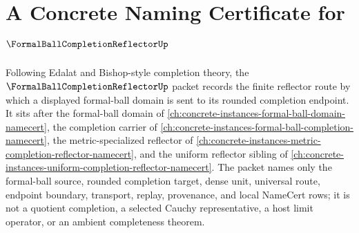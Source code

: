 \chapter{A Concrete Naming Certificate for $\FormalBallCompletionReflectorUp$}
\label{ch:concrete-instances-formal-ball-completion-reflector-namecert}

Following Edalat and Bishop-style completion theory, the $\FormalBallCompletionReflectorUp$ packet records the finite reflector route by which a displayed formal-ball domain is sent to its rounded completion endpoint. It sits after the formal-ball domain of \autoref{ch:concrete-instances-formal-ball-domain-namecert}, the completion carrier of \autoref{ch:concrete-instances-formal-ball-completion-namecert}, the metric-specialized reflector of \autoref{ch:concrete-instances-metric-completion-reflector-namecert}, and the uniform reflector sibling of \autoref{ch:concrete-instances-uniform-completion-reflector-namecert}. The packet names only the formal-ball source, rounded completion target, dense unit, universal route, endpoint boundary, transport, replay, provenance, and local NameCert rows; it is not a quotient completion, a selected Cauchy representative, a host limit operator, or an ambient completeness theorem.

